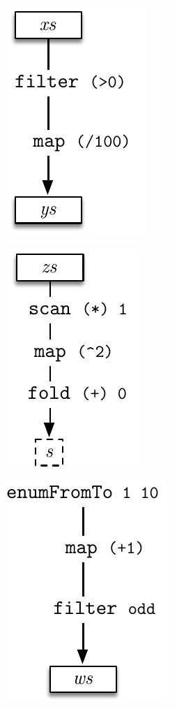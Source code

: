 \documentclass[preamble.tex]{subfiles}
\begin{document}
\begin{figure}

\begin{subfigure}{.33\textwidth}%
\includegraphics[center]{img/simple-pipeline-a}%
\end{subfigure}%
\begin{subfigure}{.33\textwidth}%
\includegraphics[center]{img/simple-pipeline-b}%
\end{subfigure}%
\begin{subfigure}{.33\textwidth}%
\includegraphics[center]{img/simple-pipeline-c}%

\end{subfigure}
\end{figure}
\end{document}
